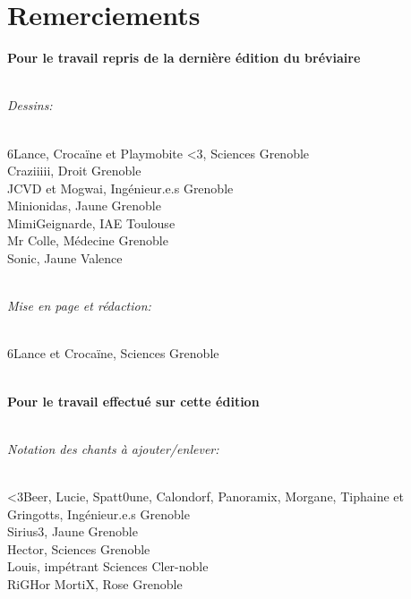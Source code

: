 \documentclass[a5paper,twoside,openright]{article} %
\begin{document}
\section*{Remerciements} \label{Remerciements}
\noindent

\textbf{Pour le travail repris de la dernière édition du bréviaire}

\\\textit{Dessins:}
\begin{addmargin}[1em]{2em}%
\\6Lance, Crocaïne et Playmobite <3{\color{falGrey!60!black}, Sciences Grenoble}
\\Craziiiii{\color{falGrey!60!black}, Droit Grenoble}
\\JCVD et Mogwai{\color{falGrey!60!black}, Ingénieur.e.s Grenoble}
\\Minionidas{\color{falGrey!60!black}, Jaune Grenoble}
\\MimiGeignarde{\color{falGrey!60!black}, IAE Toulouse}
\\Mr Colle{\color{falGrey!60!black}, Médecine Grenoble}
\\Sonic{\color{falGrey!60!black}, Jaune Valence}\\
\end{addmargin}

\\\textit{Mise en page et rédaction:}
\begin{addmargin}[1em]{2em}%
\\6Lance et Crocaïne{\color{falGrey!60!black}, Sciences Grenoble}\\
\end{addmargin}

\bigskip
\\\textbf{Pour le travail effectué sur cette édition}

\\\textit{Notation des chants à ajouter/enlever:}
\begin{addmargin}[1em]{2em}%
\\<3Beer, Lucie, Spatt0une, Calondorf, Panoramix, Morgane, Tiphaine et Gringotts{\color{falGrey!60!black}, Ingénieur.e.s Grenoble}
\\Sirius3{\color{falGrey!60!black}, Jaune Grenoble}
\\Hector{\color{falGrey!60!black}, Sciences Grenoble}
\\Louis{\color{falGrey!60!black}, impétrant Sciences Cler-noble}
\\RiGHor MortiX{\color{falGrey!60!black}, Rose Grenoble}\\
\end{addmargin}
\end{document}
